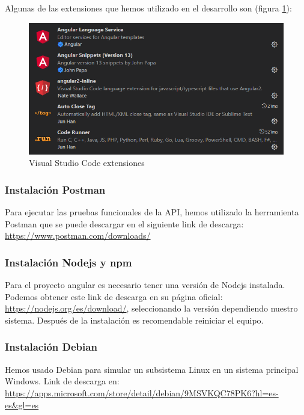 Algunas de las extensiones que hemos utilizado en el desarrollo son (figura \ref{fig:visualstudio_extensions}):

\begin{figure}[h!] 
\centering
    \includegraphics[width=1\textwidth]{img/visualcode_extensiones.PNG}
\caption{Visual Studio Code extensiones}
\label{fig:visualstudio_extensions}
\end{figure}

\subsubsection{Instalación Postman}

Para ejecutar las pruebas funcionales de la API, hemos utilizado la herramienta Postman que se puede descargar en el siguiente link de descarga: \url{https://www.postman.com/downloads/}

\subsubsection{Instalación Nodejs y npm}

Para el proyecto angular es necesario tener una versión de Nodejs instalada. Podemos obtener este link de descarga en su página oficial: \url{https://nodejs.org/es/download/}, seleccionando la versión dependiendo nuestro sistema. Después de la instalación es recomendable reiniciar el equipo.

\subsubsection{Instalación Debian}

Hemos usado Debian para simular un subsistema Linux en un sistema principal Windows. Link de descarga en: \url{https://apps.microsoft.com/store/detail/debian/9MSVKQC78PK6?hl=es-es&gl=es}



